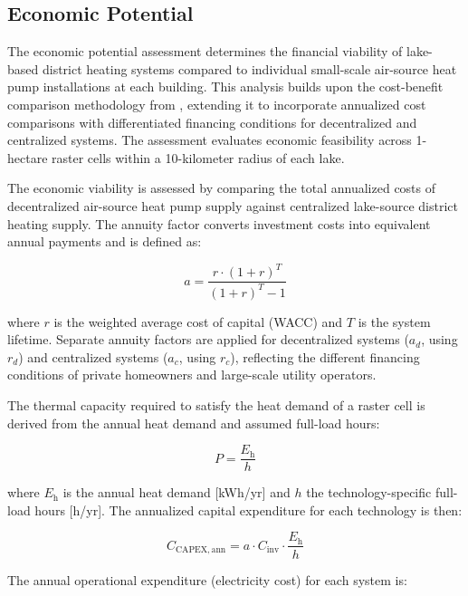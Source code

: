 \subsection{Economic Potential}

The economic potential assessment determines the financial viability of lake-based district heating systems compared to individual small-scale air-source heat pump installations at each building. This analysis builds upon the cost-benefit comparison methodology from \cite{Eggimann.2023}, extending it to incorporate annualized cost comparisons with differentiated financing conditions for decentralized and centralized systems. The assessment evaluates economic feasibility across 1-hectare raster cells within a 10-kilometer radius of each lake.

The economic viability is assessed by comparing the total annualized costs of decentralized air-source heat pump supply against centralized lake-source district heating supply. The annuity factor converts investment costs into equivalent annual payments and is defined as:

\begin{equation}
a = \frac{r \cdot (1 + r)^T}{(1 + r)^T - 1}
\label{eq:annuity}
\end{equation}

\noindent where $r$ is the weighted average cost of capital (WACC) and $T$ is the system lifetime. Separate annuity factors are applied for decentralized systems ($a_d$, using $r_d$) and centralized systems ($a_c$, using $r_c$), reflecting the different financing conditions of private homeowners and large-scale utility operators.

The thermal capacity required to satisfy the heat demand of a raster cell is derived from the annual heat demand and assumed full-load hours:

\begin{equation}
P = \frac{E_\mathrm{h}}{h}
\end{equation}

\noindent where $E_\mathrm{h}$ is the annual heat demand [kWh/yr] and $h$ the technology-specific full-load hours [h/yr]. The annualized capital expenditure for each technology is then:

\begin{equation}
C_\mathrm{CAPEX,ann} = a \cdot C_\mathrm{inv} \cdot \frac{E_\mathrm{h}}{h}
\end{equation}

The annual operational expenditure (electricity cost) for each system is:

